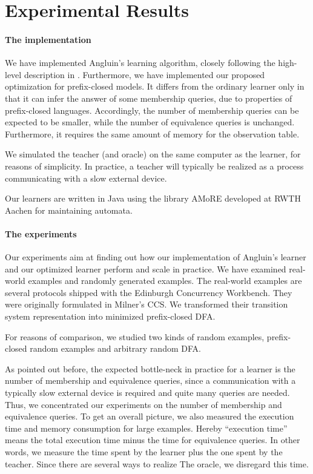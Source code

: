 \section{Experimental Results}

\label{sec:results}

\paragraph{The implementation}
We have implemented Angluin's learning algorithm, closely following the
high-level description in \cite{Angluin:regset}. Furthermore, we have
implemented our proposed optimization for prefix-closed models. It
differs from the ordinary learner only in that it can infer the answer
of some membership queries, due to properties of prefix-closed
languages. Accordingly, the number of membership queries can be
expected to be smaller, while the number of equivalence queries is
unchanged. Furthermore, it requires the same amount of memory for the
observation table.

We simulated the teacher (and oracle) on the same computer as the learner, for
reasons of simplicity. In practice, a teacher will typically be
realized as a process communicating with a slow external device.

Our learners are written in Java using the library AMoRE
developed at RWTH Aachen for maintaining automata.

\paragraph{The experiments} 
Our experiments aim at finding out how our implementation of Angluin's
learner and our optimized learner perform and scale in practice. We
have examined real-world examples and randomly generated examples. 
The real-world examples are several protocols shipped with the
Edinburgh Concurrency Workbench. They were originally formulated in
Milner's CCS. We transformed their transition system representation
into minimized prefix-closed DFA.

For reasons of comparison, we studied two kinds of random examples,
prefix-closed random examples and arbitrary random DFA.

As pointed out before, the expected bottle-neck in practice for a
learner is the number of membership and equivalence queries, since a
communication with a typically slow external device is required and
quite many queries are needed. Thus, we concentrated our experiments
on the number of membership and equivalence queries. To get an overall
picture, we also measured the execution time and memory consumption
for large examples. Hereby ``execution time'' means the total
execution time minus the time for equivalence queries. In other words,
we measure the time spent by the learner plus the one spent by the
teacher. Since there are several ways to realize The oracle, we
disregard this time.

